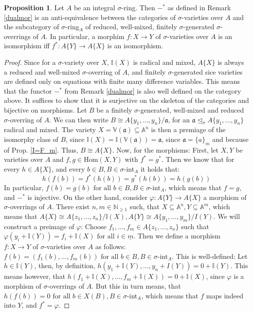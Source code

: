\documentclass{article}
\def\I{\mathbb{I}}
\def\NE{\mathbb{N}_{\geq1}}
\def\VV{\mathbb{V}}
\def\a{\mathfrak{a}}
\def\s{\sigma}
\def\si{\unlhd_{\sigma}}
\def\Hom{\text{Hom}}
\def\fa{\text{ for all }}
\newenvironment{bew}{\begin{proof}[Proof]}{\end{proof}}
\theoremstyle{definition}
\newtheorem{prop}[Satz]{Proposition}
\begin{document}
\begin{prop}\label{dualisequiv}
Let $A$ be an integral $\s$-ring. Then $-^*$ as defined in Remark \ref{dualmor} is an anti-equivalence between the categories of $\s$-varieties over $A$ and the subcategory of $\s$-ring$_A$ of reduced, well-mixed, finitely $\s$-generated $\s$-overrings of $A$. 
In particular, a morphim $f: X \rightarrow Y$ of $\s$-varieties over $A$ is an isomorphism iff $f^*: A\{Y\} \rightarrow A\{X\}$ is an isomorphism.
\begin{bew}
Since for a $\s$-variety over $X$, $\I(X)$ is radical and mixed, $A\{X\}$ is always a reduced and well-mixed $\s$-overring of $A$, 
and finitely $\s$-generated sice varieties are defined only on equations with finite many difference variables. This means that the functor $-^*$ from Remark \ref{dualmor} is also well defined on the category above.
It suffices to show that it is surjective on the skeleton of the categories and bijective on morphisms. 
Let $B$ be a finitely $\s$-generated, well-mixed and reduced $\s$-overring of $A$. We can then write $B \cong A\{y_1,\ldots,y_n\}/\a$, for an $\a \si A\{y_1,\ldots,y_n\}$ radical and mixed. The variety $X = \VV(\a) \subseteq \mathbb{A}^n$
is then a premiage of the isomorphy class of $B$, since $\I(X) = \I(\VV(\a)) = \a$, since $\a = \{ a \}_m$ and because of Prop. \ref{I=F_m}. Thus, $B \cong A\{X\}$.
Now, for the morphisms: First, let $X,Y$ be varieties over $A$ and $f,g \in \Hom(X,Y)$ with $f^* = g^*$. Then we know that for every $h \in A\{X\}$, and every $b \in B, B \in \s$-int$_A$ it holds that:
\[ h(f(b)) = f^*(h(b)) = g^*(h(b)) = h(g(b)) \]
In particular, $f(b) = g(b) \fa b \in B, B \in \s$-int$_A$, which means that $f = g$, and $-^*$ is injective. 
On the other hand, consider $\varphi: A\{Y\} \rightarrow A\{X\}$ a morphism of $\s$-overrings of $A$. There exist $n,m \in \NE$ such, that $X \subseteq \mathbb{A}^n, Y \subseteq \mathbb{A}^m$,
 which means that $A\{X\} \cong A\{z_1,\ldots,z_n\}/\I(X), A\{Y\} \cong A\{y_1,\ldots,y_m\}/I(Y)$. We will construct a preimage of $\varphi$: Choose $f_1,\ldots,f_m \in A\{z_1,\ldots,z_n\}$ such that $\varphi(y_i + \I(Y)) = f_i + \I(X) \fa i \in \underline{m}$.
Then we define a morphism $f: X \rightarrow Y$ of $\s$-varieties over $A$ as follows: $f(b) = (f_1(b),\ldots,f_m(b)) \fa b \in B, B \in \s$-int$_A$. This is well-defined: Let $h \in \I(Y)$, then, by definition, $h(y_1 + \I(Y),\ldots,y_n + I(Y)) = 0 + \I(Y)$.
This means however, that $h(f_1 + \I(X),\ldots,f_m + \I(X)) = 0 + \I(X)$, since $\varphi$ is a morphism of $\s$-overrings of $A$. But this in turn means, that $h(f(b)) = 0 \fa b \in X(B), B \in \s$-int$_A$, which means that $f$ maps indeed into $Y$, and $f^* = \varphi$.
\end{bew}
\end{prop}
\end{document}
